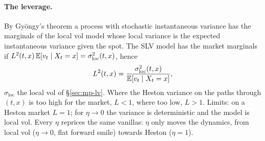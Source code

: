\paragraph{The leverage.} By Gyöngy's theorem \citep{gyongy1986} a process with stochastic instantaneous variance has the
marginals of the local vol model whose local variance is the expected instantaneous variance given the spot. The SLV
model has the market marginals if $L^2(t, x)\,\mathbb{E}[v_t \mid X_t = x] = \sigma_{\mathrm{loc}}^2(t, x)$, hence
\[
  L^2(t, x) = \frac{\sigma_{\mathrm{loc}}^2(t, x)}{\mathbb{E}[v_t \mid X_t = x]} ,
\]
$\sigma_{\mathrm{loc}}$ the local vol of \S\ref{sec:mp-lv}. Where the Heston variance on the paths through $(t, x)$ is too high for the
market, $L < 1$, where too low, $L > 1$. Limits: on a Heston market $L = 1$; for $\eta \to 0$ the variance is deterministic and
the model is local vol. Every $\eta$ reprices the same vanillas: $\eta$ only moves the dynamics, from local vol ($\eta \to 0$,
flat forward smile) towards Heston ($\eta = 1$).

